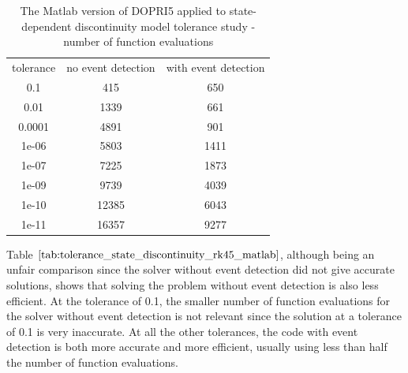 \begin{table}[h]
\caption {The Matlab version of DOPRI5 applied to state-dependent discontinuity model tolerance study - number of function evaluations} 
\label{tab:tolerance_state_discontinuity_rk45_matlab} 
\begin{center}
\begin{tabular}{ c c c }
tolerance & no event detection & with event detection \\
0.1 & 415 & 650 \\
0.01 & 1339 & 661 \\
0.0001 & 4891 & 901 \\
1e-06 & 5803 & 1411 \\
1e-07 & 7225 & 1873 \\
1e-09 & 9739 & 4039 \\
1e-10 & 12385 & 6043 \\
1e-11 & 16357 & 9277 \\
\end{tabular}
\end{center}
\end{table}

Table $\ref{tab:tolerance_state_discontinuity_rk45_matlab}$, although being an unfair comparison since the solver without event detection did not give accurate solutions, shows that solving the problem without event detection is also less efficient. At the tolerance of 0.1, the smaller number of function evaluations for the solver without event detection is not relevant since the solution at a tolerance of 0.1 is very inaccurate. At all the other tolerances, the code with event detection is both more accurate and more efficient, usually using less than half the number of function evaluations.

